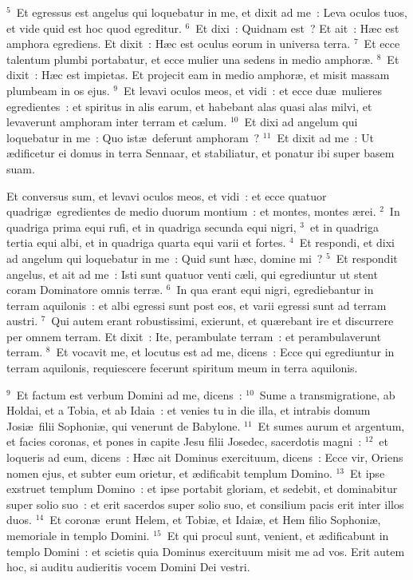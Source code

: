 ${}^{5}$~Et egressus est angelus qui loquebatur in me, et dixit ad me~: Leva oculos tuos, et vide quid est hoc quod egreditur.
${}^{6}$~Et dixi~: Quidnam est~? Et ait~: H\ae c est amphora egrediens. Et dixit~: H\ae c est oculus eorum in universa terra.
${}^{7}$~Et ecce talentum plumbi portabatur, et ecce mulier una sedens in medio amphor\ae .
${}^{8}$~Et dixit~: H\ae c est impietas. Et projecit eam in medio amphor\ae , et misit massam plumbeam in os ejus.
${}^{9}$~Et levavi oculos meos, et vidi~: et ecce du\ae\ mulieres egredientes~: et spiritus in alis earum, et habebant alas quasi alas milvi, et levaverunt amphoram inter terram et c\ae lum.
${}^{10}$~Et dixi ad angelum qui loquebatur in me~: Quo ist\ae\ deferunt amphoram~?
${}^{11}$~Et dixit ad me~: Ut \ae dificetur ei domus in terra Sennaar, et stabiliatur, et ponatur ibi super basem suam.

\bchapter
\lettrine[lines=3,image=true,loversize=0.05,lraise=-0.03]{E}{}t conversus sum, et levavi oculos meos, et vidi~: et ecce quatuor quadrig\ae\ egredientes de medio duorum montium~: et montes, montes \ae rei.
${}^{2}$~In quadriga prima equi rufi, et in quadriga secunda equi nigri,
${}^{3}$~et in quadriga tertia equi albi, et in quadriga quarta equi varii et fortes.
${}^{4}$~Et respondi, et dixi ad angelum qui loquebatur in me~: Quid sunt h\ae c, domine mi~?
${}^{5}$~Et respondit angelus, et ait ad me~: Isti sunt quatuor venti c\ae li, qui egrediuntur ut stent coram Dominatore omnis terr\ae .
${}^{6}$~In qua erant equi nigri, egrediebantur in terram aquilonis~: et albi egressi sunt post eos, et varii egressi sunt ad terram austri.
${}^{7}$~Qui autem erant robustissimi, exierunt, et qu\ae rebant ire et discurrere per omnem terram. Et dixit~: Ite, perambulate terram~: et perambulaverunt terram.
${}^{8}$~Et vocavit me, et locutus est ad me, dicens~: Ecce qui egrediuntur in terram aquilonis, requiescere fecerunt spiritum meum in terra aquilonis.


${}^{9}$~Et factum est verbum Domini ad me, dicens~:
${}^{10}$~Sume a transmigratione, ab Holdai, et a Tobia, et ab Idaia~: et venies tu in die illa, et intrabis domum Josi\ae\ filii Sophoni\ae , qui venerunt de Babylone.
${}^{11}$~Et sumes aurum et argentum, et facies coronas, et pones in capite Jesu filii Josedec, sacerdotis magni~:
${}^{12}$~et loqueris ad eum, dicens~: H\ae c ait Dominus exercituum, dicens~: Ecce vir, Oriens nomen ejus, et subter eum orietur, et \ae dificabit templum Domino.
${}^{13}$~Et ipse exstruet templum Domino~: et ipse portabit gloriam, et sedebit, et dominabitur super solio suo~: et erit sacerdos super solio suo, et consilium pacis erit inter illos duos.
${}^{14}$~Et coron\ae\ erunt Helem, et Tobi\ae , et Idai\ae , et Hem filio Sophoni\ae , memoriale in templo Domini.
${}^{15}$~Et qui procul sunt, venient, et \ae dificabunt in templo Domini~: et scietis quia Dominus exercituum misit me ad vos. Erit autem hoc, si auditu audieritis vocem Domini Dei vestri.

